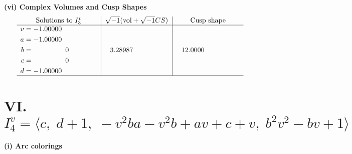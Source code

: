 \documentclass[1p]{elsarticle_modified}
\theoremstyle{definition}
\newcommand{\I}{\sqrt{-1}}
\begin{document}
\newpage\flushleft \textbf{(vi) Complex Volumes and Cusp Shapes}
$$\begin{array}{c|c|c}  
\text{Solutions to }I^v_{3}& \I (\text{vol} + \sqrt{-1}CS) & \text{Cusp shape}\\
 \hline 
\begin{aligned}
v &= -1.00000\phantom{ +0.000000I} \\
a &= -1.00000\phantom{ +0.000000I} \\
b &= \phantom{-0.000000 } 0 \\
c &= \phantom{-0.000000 } 0 \\
d &= -1.00000\phantom{ +0.000000I}\end{aligned}
 & \phantom{-}3.28987\phantom{ +0.000000I} & \phantom{-}12.0000\phantom{ +0.000000I}\\
 \hline 
 \end{array}$$\newpage\newpage\renewcommand{\arraystretch}{1}
\centering \section*{VI. $I^v_{4}= \langle c,\;d+1,\;- v^2 b a- v^2 b+a v+c+v,\;b^2 v^2- b v+1 \rangle$}
\flushleft \textbf{(i) Arc colorings}\\
\end{document}
